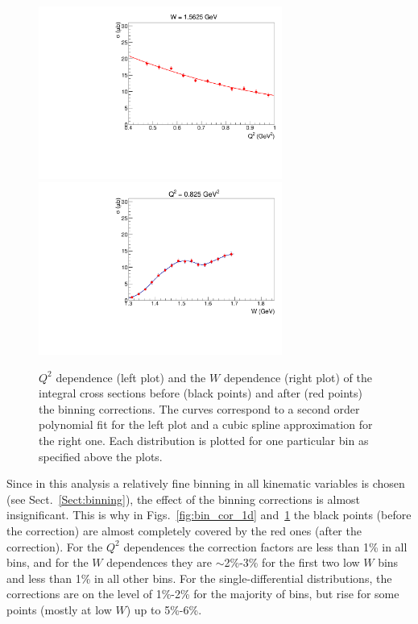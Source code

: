 \begin{figure}[htp]
\begin{center}
\includegraphics[width=8cm]{pictures/corrections/bin_cor_q2.pdf}
\includegraphics[width=8cm]{pictures/corrections/bin_cor_w.pdf}
\caption{\small $Q^{2}$ dependence (left plot) and the $W$ dependence (right plot) of the integral cross sections before (black points) and after (red points) the binning corrections. The curves correspond to a second order polynomial fit for the left plot and a cubic spline approximation for the right one. Each distribution is plotted for one particular bin as specified above the plots.} \label{fig:bincor_w_q2}
\end{center}
\end{figure}
 
Since in this analysis a relatively fine binning in all kinematic variables is chosen (see Sect.~\ref{Sect:binning}), the effect of the binning corrections is almost insignificant. 
This is why in Figs.~\ref{fig:bin_cor_1d} and~\ref{fig:bincor_w_q2} the black points (before the correction) are almost completely covered by the red ones (after the correction). For the $Q^{2}$ dependences the correction factors are less than 1\% in all bins, and for the $W$ dependences they are $\sim$2\%-3\% for the first two low $W$ bins and less than 1\% in all other bins. For the single-differential distributions, the corrections are on the level of 1\%-2\% for the majority of bins, but rise for some points (mostly at low $W$) up to 5\%-6\%.



